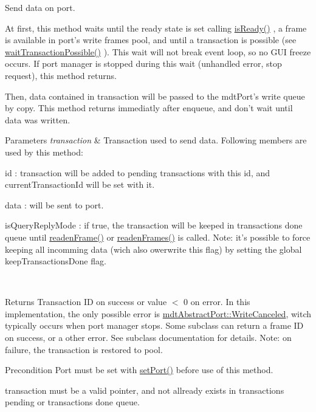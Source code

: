 Send data on port. 

At first, this method waits until the ready state is set calling \hyperlink{classmdt_port_manager_a6dc2798324521d177fb8f79d4f6c5f0f}{isReady()} , a frame is available in port's write frames pool, and until a transaction is possible (see \hyperlink{classmdt_port_manager_ac04a12f8aa20ba04695083afce45a6cc}{waitTransactionPossible()} ). This wait will not break event loop, so no GUI freeze occurs. If port manager is stopped during this wait (unhandled error, stop request), this method returns.

Then, data contained in transaction will be passed to the mdtPort's write queue by copy. This method returns immediatly after enqueue, and don't wait until data was written.


\begin{DoxyParams}{Parameters}
{\em transaction} & Transaction used to send data. Following members are used by this method:
\begin{DoxyItemize}
\item id : transaction will be added to pending transactions with this id, and currentTransactionId will be set with it.
\item data : will be sent to port.
\item isQueryReplyMode : if true, the transaction will be keeped in transactions done queue until \hyperlink{classmdt_port_manager_a830ae182d06dd6a52c43a7f45b9240ac}{readenFrame()} or \hyperlink{classmdt_port_manager_addd5dcae9644cea42a9871205af41796}{readenFrames()} is called. Note: it's possible to force keeping all incomming data (wich also owerwrite this flag) by setting the global keepTransactionsDone flag.
\end{DoxyItemize}\\
\hline
\end{DoxyParams}
\begin{DoxyReturn}{Returns}
Transaction ID on success or value $<$ 0 on error. In this implementation, the only possible error is \hyperlink{classmdt_abstract_port_ad4121bb930c95887e77f8bafa065a85eae50ff4a9393507ad39005ddc7d5be42f}{mdtAbstractPort::WriteCanceled}, witch typically occurs when port manager stops. Some subclass can return a frame ID on success, or a other error. See subclass documentation for details. Note: on failure, the transaction is restored to pool. 
\end{DoxyReturn}
\begin{DoxyPrecond}{Precondition}
Port must be set with \hyperlink{classmdt_port_manager_afcd156b2d0c9d340999935efb6cd8cb6}{setPort()} before use of this method. 

transaction must be a valid pointer, and not allready exists in transactions pending or transactions done queue.
\end{DoxyPrecond}
